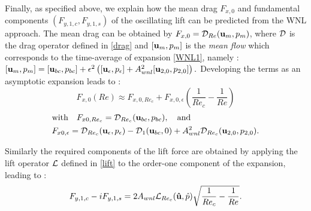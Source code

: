 \documentclass[twocolumn,10pt]{asme2ej}
\newcommand{\be}[1]{ \begin{equation} \label{#1}}
\newcommand{\ee}{\end{equation}}
\begin{document}
Finally, as specified above, we explain how the mean drag $F_{x,0}$ and fundamental components $(F_{y,1,c},F_{y,1,s})$ of the oscillating lift can be predicted from the WNL approach.
The mean drag  can be obtained by $F_{x,0} = {\cal D}_{Re}({\bf u}_m,p_m)$, where ${\cal D}$ is the drag operator defined in \ref{drag} and 
$[{\bf u}_m,p_m]$ is the {\em mean flow}  
which corresponds to the time-average of expansion  \ref{WNL1}, namely :
$
[{\bf u}_m,p_m] = [{\bf u}_{bc},p_{bc}] +\epsilon^2 \left( [{\bf u}_\epsilon,p_\epsilon] + A_{wnl}^2 [{\bf u}_{2,0}, p_{2,0} ] \right).
$
Developing the terms as an asymptotic expansion leads to :
\be{drag_cos}
 F_{x,0}(Re) \approx F_{x,0,{Re_c}} +  F_{x,0,\epsilon} \left(\frac{1}{Re_c}-\frac{1}{Re}\right)
\ee 
\begin{equation*}
\begin{aligned}
& \mbox{with} \quad F_{x0,{Re_c}}  = {\cal D}_{Re_c} ({\bf u}_{bc},p_{bc}), \quad \mbox{and}  
\\ 
& F_{x0,\epsilon} = {\cal D}_{Re_c} ({\bf u}_\epsilon, p_\epsilon ) - {\cal D}_{1} ({\bf u}_{bc},0) 
+ A_{wnl}^2 {\cal D}_{Re_c} ({\bf u}_{2,0},p_{2,0}). 
\end{aligned}
\end{equation*}

Similarly the required components of the lift force are obtained by applying the lift operator ${\cal L}$ defined in \ref{lift} 
to the order-one component of the expansion, leading to :
\be{lift_cos}
F_{y,1,c} - i F_{y,1,s} = 2 A_{wnl} {\cal{L}}_{Re_c}( {\bf \hat{u}},\hat{p} ) \sqrt{\frac{1}{Re_c}-\frac{1}{Re}}.
\ee


\end{document}
